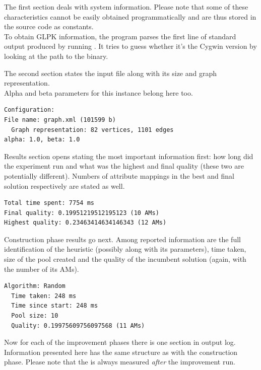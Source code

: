\documentclass[a4paper,12pt,oneside]{report}
\newcommand{\code}[1]{\texttt{\StrSubstitute{#1}{.}{.\.}}}
\def\.{\discretionary{}{}{}}
\theoremstyle{definition}
\begin{document}
The first section deals with system information. Please note that some of these characteristics cannot be easily obtained programmatically and are thus stored in the source code as constants.\\
To obtain GLPK information, the program parses the first line of standard output produced by running \code{glpsol -v}. It tries to guess whether it's the Cygwin version by looking at the path to the binary.

The second section states the input file along with its size and graph representation.\\
Alpha and beta parameters for this instance belong here too.

\begin{footnotesize}
\begin{verbatim}
Configuration:
File name: graph.xml (101599 b)
  Graph representation: 82 vertices, 1101 edges
alpha: 1.0, beta: 1.0
\end{verbatim}
\end{footnotesize}

Results section opens stating the most important information first: how long did the experiment run and what was the highest and final quality (these two are potentially different). Numbers of attribute mappings in the best and final solution respectively are stated as well.

\begin{footnotesize}
\begin{verbatim}
Total time spent: 7754 ms
Final quality: 0.19951219512195123 (10 AMs)
Highest quality: 0.23463414634146343 (12 AMs)
\end{verbatim}
\end{footnotesize}

Construction phase results go next. Among reported information are the full identification of the heuristic (possibly along with its parameters), time taken, size of the pool created and the quality of the incumbent solution (again, with the number of its AMs).

\begin{footnotesize}
\begin{verbatim}
Algorithm: Random
  Time taken: 248 ms
  Time since start: 248 ms
  Pool size: 10
  Quality: 0.19975609756097568 (11 AMs)
\end{verbatim}
\end{footnotesize}

Now for each of the improvement phases there is one section in output log. Information presented here has the same structure as with the construction phase. Please note that the \code{Pool size} is always measured \textit{after} the improvement run.
\end{document}
